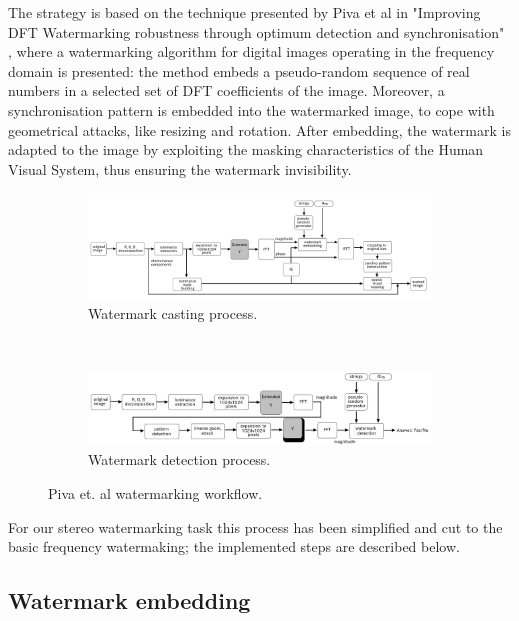The strategy is based on the technique presented by Piva et al in "Improving DFT Watermarking robustness through optimum detection and synchronisation" \cite{PIVA}, where a watermarking algorithm for digital images operating in the frequency domain is presented: the method embeds a pseudo-random sequence of real numbers in a selected set of DFT coefficients of the image. Moreover, a synchronisation pattern is embedded into the watermarked image, to cope with geometrical attacks, like resizing and rotation. After embedding, the watermark is adapted to the image by exploiting the masking characteristics of the Human Visual System, thus ensuring the watermark invisibility.\newline
\begin{figure}[h!]
\centering
\begin{subfigure}[]{\textwidth}
\centering
\includegraphics[width=1\textwidth]{./img/casting.jpg}
\caption{\scriptsize{Watermark casting process.}\label{fig:cast}}
\end{subfigure} 
~\quad
\begin{subfigure}[]{\textwidth}
\centering
\includegraphics[width=1\textwidth]{./img/detection.jpg}
\caption{\scriptsize{Watermark detection process.}\label{fig:det}}
\end{subfigure}%
\caption{\small{Piva et. al watermarking workflow.}\label{fig:blocchi}}
\end{figure}

For our stereo watermarking task this process has been simplified and cut to the basic frequency watermaking; the implemented steps are described below.

\subsection{Watermark embedding} 
\label{wat_emb}

